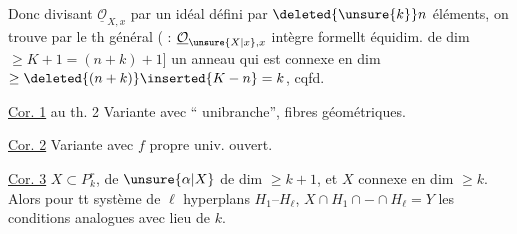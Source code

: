 
Donc divisant $\underline{\mathcal O}_{X,x}$ par un idéal défini par $\deleted{\unsure{k}}n$ éléments, on  trouve par le th général  ( : $\underline{\mathcal O}_{\unsure{X|x},x}$ intègre formellt équidim. de dim $\geq K+1=(n+k)+1$] un anneau qui est connexe en dim $\geq\deleted{(n+k)}\inserted{K-n}=k$, cqfd.

\uline{Cor. 1} au th. 2 Variante avec  ``  unibranche'', \unsure{*}  fibres géométriques.

\uline{Cor. 2} Variante avec $f$ propre univ. ouvert.

\uline{Cor. 3} $X\subset P^r_k$,   de $\unsure{\alpha|X}$ de dim $\geq k+1$, et $X$ connexe en dim $\geq k$. Alors pour tt système de $\ell$ hyperplans $H_1\text{--}H_\ell$,   $X\cap H_1\cap-\cap H_\ell=Y$  les conditions analogues avec  lieu de $k$.

